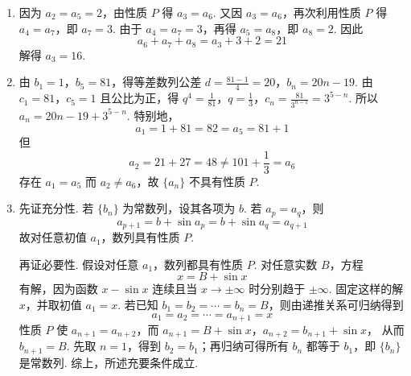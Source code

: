 \begin{solution}
\begin{enumerate}
\item 因为 \(a_2=a_5=2\)，由性质 \(P\) 得 \(a_3=a_6\). 又因 \(a_3=a_6\)，再次利用性质 \(P\) 得 \(a_4=a_7\)，即 \(a_7=3\). 由于 \(a_4=a_7=3\)，再得 \(a_5=a_8\)，即 \(a_8=2\). 因此
\[
a_6+a_7+a_8=a_3+3+2=21
\]
解得 \(a_3=16\).
\item 由 \(b_1=1\)，\(b_5=81\)，得等差数列公差
\(d=\frac{81-1}{4}=20\)，\(b_n=20n-19\).
由 \(c_1=81\)，\(c_5=1\) 且公比为正，得
\(q^4=\frac1{81}\)，\(q=\frac13\)，\(c_n=\frac{81}{3^{n-1}}=3^{5-n}\).
所以 \(a_n=20n-19+3^{5-n}\). 特别地，
\[
a_1=1+81=82=a_5=81+1
\]
但
\[
a_2=21+27=48\ne101+\frac13=a_6
\]
存在 \(a_1=a_5\) 而 \(a_2\ne a_6\)，故 \(\{a_n\}\) 不具有性质 \(P\).
\item 先证充分性. 若 \(\{b_n\}\) 为常数列，设其各项为 \(b\). 若 \(a_p=a_q\)，则
\[
a_{p+1}=b+\sin a_p=b+\sin a_q=a_{q+1}
\]
故对任意初值 \(a_1\)，数列具有性质 \(P\).

再证必要性. 假设对任意 \(a_1\)，数列都具有性质 \(P\). 对任意实数 \(B\)，方程
\[
x=B+\sin x
\]
有解，因为函数 \(x-\sin x\) 连续且当 \(x\to\pm\infty\) 时分别趋于 \(\pm\infty\). 固定这样的解 \(x\)，并取初值 \(a_1=x\). 若已知 \(b_1=b_2=\cdots=b_n=B\)，则由递推关系可归纳得到
\[
a_1=a_2=\cdots=a_{n+1}=x
\]
性质 \(P\) 使 \(a_{n+1}=a_{n+2}\)，而
\(a_{n+1}=B+\sin x\)，\(a_{n+2}=b_{n+1}+\sin x\)，
从而 \(b_{n+1}=B\). 先取 \(n=1\)，得到 \(b_2=b_1\)；再归纳可得所有 \(b_n\) 都等于 \(b_1\)，即 \(\{b_n\}\) 是常数列. 综上，所述充要条件成立.
\end{enumerate}
\end{solution}

